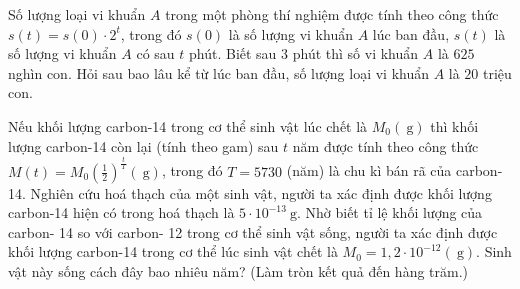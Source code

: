 \begin{bt}%
 
	Số lượng loại vi khuẩn $A$ trong một phòng thí nghiệm được tính theo công thức $s(t)=s(0)\cdot 2^t$, trong đó $s(0)$ là số lượng vi khuẩn $A$ lúc ban đầu, $s(t)$ là số lượng vi khuẩn $A$ có sau $t$ phút. Biết sau $3$ phút thì số vi khuẩn $A$ là $625$ nghìn con. Hỏi sau bao lâu kể từ lúc ban đầu, số lượng loại vi khuẩn $A$ là $20$ triệu con.
\end{bt}

\begin{bt}%
 
 Nếu khối lượng carbon-14 trong cơ thể sinh vật lúc chết là $M_0(\mathrm{~g})$ thì khối lượng carbon-14 còn lại (tính theo gam) sau $t$ năm được tính theo công thức $M(t)=M_0\left(\frac{1}{2}\right)^{\frac{t}{T}}(\mathrm{~g})$, trong đó $T=5730$ (năm) là chu kì bán rã của carbon-14. Nghiên cứu hoá thạch của một sinh vật, người ta xác định được khối lượng carbon-14 hiện có trong hoá thạch là $5 \cdot 10^{-13} \mathrm{~g}$. Nhờ biết tỉ lệ khối lượng của carbon- 14 so với carbon- 12 trong cơ thể sinh vật sống, người ta xác định được khối lượng carbon-14 trong cơ thể lúc sinh vật chết là $M_0=1,2 \cdot 10^{-12}(\mathrm{~g})$. Sinh vật này sống cách đây bao nhiêu năm? (Làm tròn kết quả đến hàng trăm.)
\end{bt}

